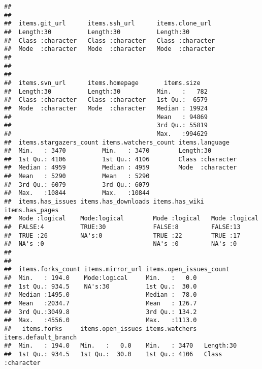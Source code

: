 \documentclass{article}\usepackage[]{graphicx}\usepackage[]{color}
\makeatletter
\newenvironment{kframe}{%
 \def\at@end@of@kframe{}%
 \ifinner\ifhmode%
  \def\at@end@of@kframe{\end{minipage}}%
  \begin{minipage}{\columnwidth}%
 \fi\fi%
 \def\FrameCommand##1{\hskip\@totalleftmargin \hskip-\fboxsep
 \colorbox{shadecolor}{##1}\hskip-\fboxsep
     \hskip-\linewidth \hskip-\@totalleftmargin \hskip\columnwidth}%
 \MakeFramed {\advance\hsize-\width
   \@totalleftmargin\z@ \linewidth\hsize
   \@setminipage}}%
 {\par\unskip\endMakeFramed%
 \at@end@of@kframe}
\newenvironment{knitrout}{}{} %
\makeatother
\begin{document}
\begin{knitrout}
\begin{kframe}
\begin{verbatim}
##                                                          
##                                                          
##  items.git_url      items.ssh_url      items.clone_url   
##  Length:30          Length:30          Length:30         
##  Class :character   Class :character   Class :character  
##  Mode  :character   Mode  :character   Mode  :character  
##                                                          
##                                                          
##                                                          
##  items.svn_url      items.homepage       items.size    
##  Length:30          Length:30          Min.   :   782  
##  Class :character   Class :character   1st Qu.:  6579  
##  Mode  :character   Mode  :character   Median : 19924  
##                                        Mean   : 94869  
##                                        3rd Qu.: 55819  
##                                        Max.   :994629  
##  items.stargazers_count items.watchers_count items.language    
##  Min.   : 3470          Min.   : 3470        Length:30         
##  1st Qu.: 4106          1st Qu.: 4106        Class :character  
##  Median : 4959          Median : 4959        Mode  :character  
##  Mean   : 5290          Mean   : 5290                          
##  3rd Qu.: 6079          3rd Qu.: 6079                          
##  Max.   :10844          Max.   :10844                          
##  items.has_issues items.has_downloads items.has_wiki  items.has_pages
##  Mode :logical    Mode:logical        Mode :logical   Mode :logical  
##  FALSE:4          TRUE:30             FALSE:8         FALSE:13       
##  TRUE :26         NA's:0              TRUE :22        TRUE :17       
##  NA's :0                              NA's :0         NA's :0        
##                                                                      
##                                                                      
##  items.forks_count items.mirror_url items.open_issues_count
##  Min.   : 194.0    Mode:logical     Min.   :   0.0         
##  1st Qu.: 934.5    NA's:30          1st Qu.:  30.0         
##  Median :1495.0                     Median :  78.0         
##  Mean   :2034.7                     Mean   : 126.7         
##  3rd Qu.:3049.8                     3rd Qu.: 134.2         
##  Max.   :4556.0                     Max.   :1113.0         
##   items.forks     items.open_issues items.watchers  items.default_branch
##  Min.   : 194.0   Min.   :   0.0    Min.   : 3470   Length:30           
##  1st Qu.: 934.5   1st Qu.:  30.0    1st Qu.: 4106   Class :character    

\end{verbatim}
\end{kframe}
\end{knitrout}
\end{document}
